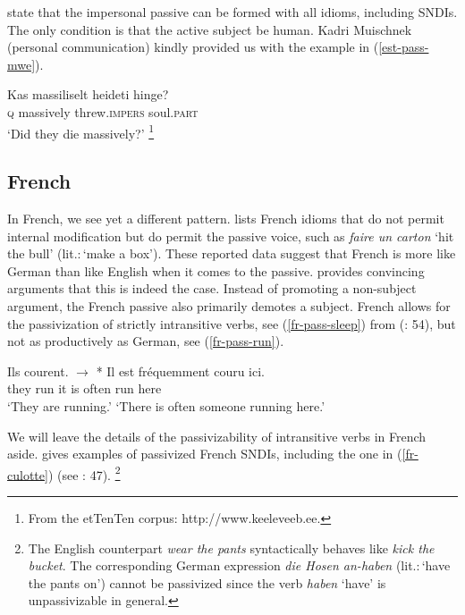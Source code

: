 \documentclass[output=paper]{langsci/langscibook}
\begin{document}
\cite{Muischnek:Kaalep:10} state that the impersonal passive can be formed with all idioms, including SNDIs. The only condition is that the active subject be human. Kadri Muischnek (personal communication) kindly provided us with the example in (\ref{est-pass-mwe}).

\ea
\gll Kas massiliselt heideti hinge?\label{est-pass-mwe}\\
\textsc{q} massively threw.\textsc{impers} soul.\textsc{part} \\ 
\glt `Did they die massively?'%
\footnote{From the etTenTen corpus: http://www.keeleveeb.ee.}
\z

\subsection{French}

In French, we see yet a different pattern. \cite{Abeille95} lists French idioms that do not permit internal modification but do permit the  passive voice, such as \textit{faire un carton} `hit the bull' (lit.:\,`make a box'). These reported data suggest that French is more like German than like English when it comes to the passive. 
\cite{Lamiroy:93} provides convincing arguments that this is indeed the case. Instead of promoting a non-subject argument, the French passive also primarily demotes a subject. 
French allows for the passivization of strictly intransitive verbs, see (\ref{fr-pass-sleep}) from \citeauthor{Lamiroy:93} (\citeyear{Lamiroy:93}: 54), but not as productively as German, see (\ref{fr-pass-run}).

\begin{exe}
\ex\label{fr-pass}
\begin{xlist}
\ex \label{fr-pass-run}
{
\gll Ils courent. {\qquad $\longrightarrow$}  * Il est fr\'equemment couru ici.\\
they run {} {} it is often run here\\
\glt `They are running.'  \qquad  `There is often someone running here.'
}
\end{xlist}
\end{exe}

We will leave the details of the  passivizability of intransitive verbs in French aside. \cite{Gaatone:93} gives examples of passivized French SNDIs, including the one in (\ref{fr-culotte}) (see \citeauthor{Gaatone:93} \citeyear{Gaatone:93}: 47).%
\footnote{The English counterpart \textit{wear the pants} syntactically behaves like \textit{kick the bucket}. The corresponding German expression \textit{die Hosen an-haben} (lit.:\,`have the pants on') cannot be passivized since the verb \textit{haben} `have' is unpassivizable in general.} 
\end{document}
